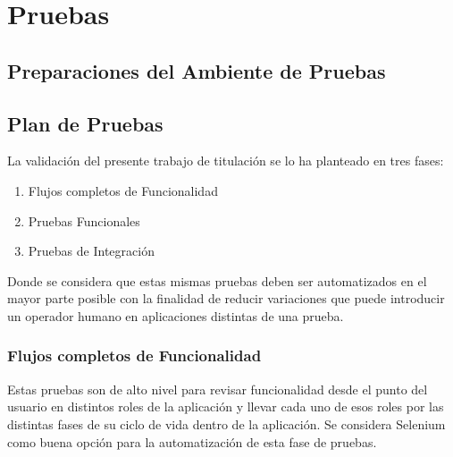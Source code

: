 
\chapter{Pruebas}
\label{capitulo5}

\section{Preparaciones del Ambiente de Pruebas}

\section{Plan de Pruebas}
La validación del presente trabajo de titulación se lo ha planteado en tres fases:
\begin{enumerate}
  \item Flujos completos de Funcionalidad
  \item Pruebas Funcionales
  \item Pruebas de Integración
\end{enumerate}
Donde se considera que estas mismas pruebas deben ser automatizados en el mayor parte posible con la finalidad de reducir variaciones que puede introducir un operador humano en aplicaciones distintas de una prueba.

\subsection{Flujos completos de Funcionalidad}
Estas pruebas son de alto nivel para revisar funcionalidad desde el punto del usuario en distintos roles de la aplicación y llevar cada uno de esos roles por las distintas fases de su ciclo de vida dentro de la aplicación. Se considera Selenium como buena opción para la automatización de esta fase de pruebas.

